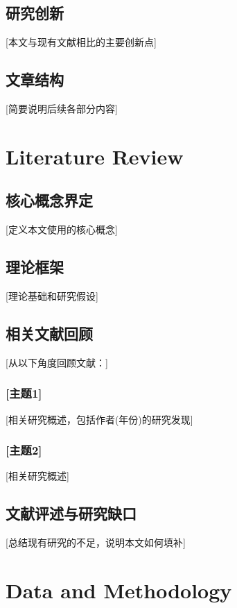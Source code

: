 \documentclass[a4paper,12pt]{article}
\numberwithin{equation}{section}
\begin{document}
\subsection{研究创新}
[本文与现有文献相比的主要创新点]

\subsection{文章结构}
[简要说明后续各部分内容]

\section{Literature Review}
\label{sec:lit}

\subsection{核心概念界定}
[定义本文使用的核心概念]

\subsection{理论框架}
[理论基础和研究假设]

\subsection{相关文献回顾}
[从以下角度回顾文献：]

\subsubsection{[主题1]}
[相关研究概述，包括作者(年份)的研究发现]

\subsubsection{[主题2]}
[相关研究概述]

\subsection{文献评述与研究缺口}
[总结现有研究的不足，说明本文如何填补]

\section{Data and Methodology}
\label{sec:data}
\end{document}
